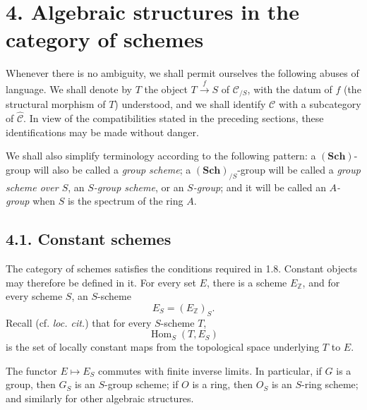 
\section*{4. Algebraic structures in the category of schemes}

Whenever there is no ambiguity, we shall permit ourselves the following
abuses of language. We shall denote by \(T\) the object
\(T\xrightarrow{f}S\) of \(\mathscr C_{/S}\), with the datum of \(f\)
(the structural morphism of \(T\)) understood, and we shall identify
\(\mathscr C\) with a subcategory of \(\widehat{\mathscr C}\). In view of
the compatibilities stated in the preceding sections, these identifications
may be made without danger.

We shall also simplify terminology according to the following pattern: a
\((\mathbf{Sch})\)-group will also be called a \emph{group scheme}; a
\((\mathbf{Sch})_{/S}\)-group will be called a \emph{group scheme over
\(S\)}, an \emph{\(S\)-group scheme}, or an \emph{\(S\)-group}; and it
will be called an \emph{\(A\)-group} when \(S\) is the spectrum of the
ring \(A\).

\subsection*{4.1. Constant schemes}

The category of schemes satisfies the conditions required in 1.8. Constant
objects may therefore be defined in it. For every set \(E\), there is a
scheme \(E_{\mathbb Z}\), and for every scheme \(S\), an \(S\)-scheme
\[
  E_S=(E_{\mathbb Z})_S.
\]
Recall (cf. \emph{loc. cit.}) that for every \(S\)-scheme \(T\),
\[
  \operatorname{Hom}_S(T,E_S)
\]
is the set of locally constant maps from the topological space underlying
\(T\) to \(E\).

The functor \(E\mapsto E_S\) commutes with finite inverse limits. In
particular, if \(G\) is a group, then \(G_S\) is an \(S\)-group scheme;
if \(O\) is a ring, then \(O_S\) is an \(S\)-ring scheme; and similarly
for other algebraic structures.

